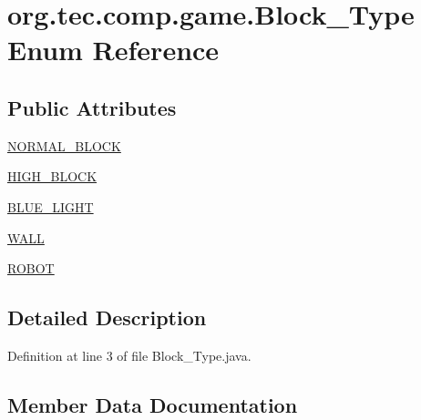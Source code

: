 \hypertarget{enumorg_1_1tec_1_1comp_1_1game_1_1_block___type}{}\section{org.\+tec.\+comp.\+game.\+Block\+\_\+\+Type Enum Reference}
\label{enumorg_1_1tec_1_1comp_1_1game_1_1_block___type}
\subsection*{Public Attributes}
\begin{DoxyCompactItemize}
\item 
\mbox{\hyperlink{enumorg_1_1tec_1_1comp_1_1game_1_1_block___type_acfa8d79116956ae8fd6095cf004a02a6}{N\+O\+R\+M\+A\+L\+\_\+\+B\+L\+O\+CK}}
\item 
\mbox{\hyperlink{enumorg_1_1tec_1_1comp_1_1game_1_1_block___type_a77d07d562b9f3ea6cc1b6d60978b1480}{H\+I\+G\+H\+\_\+\+B\+L\+O\+CK}}
\item 
\mbox{\hyperlink{enumorg_1_1tec_1_1comp_1_1game_1_1_block___type_a19984d7e754ce044d668927eb759e62f}{B\+L\+U\+E\+\_\+\+L\+I\+G\+HT}}
\item 
\mbox{\hyperlink{enumorg_1_1tec_1_1comp_1_1game_1_1_block___type_a839859bf5b5f6bd8e91694be72569895}{W\+A\+LL}}
\item 
\mbox{\hyperlink{enumorg_1_1tec_1_1comp_1_1game_1_1_block___type_a75bda04760cf7fa8b08df5c0d8ad912f}{R\+O\+B\+OT}}
\end{DoxyCompactItemize}


\subsection{Detailed Description}


Definition at line 3 of file Block\+\_\+\+Type.\+java.



\subsection{Member Data Documentation}
\mbox{\label{enumorg_1_1tec_1_1comp_1_1game_1_1_block___type_a19984d7e754ce044d668927eb759e62f}} 
